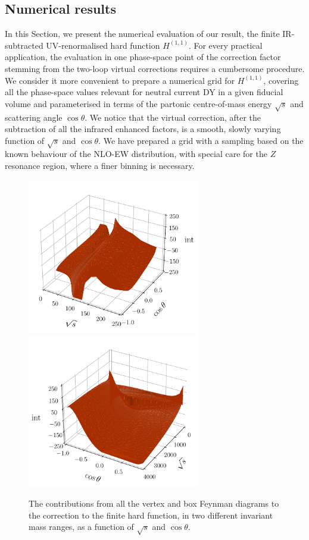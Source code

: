 \documentclass[11pt,a4paper]{article}
\begin{document}
\subsection{Numerical results}
\label{sec:numerics}
%
In this Section, we present the numerical evaluation of our result,
the finite IR-subtracted UV-renormalised hard function ${H}^{(1,1)}$.
For every practical application,
the evaluation in one phase-space point of the correction factor
stemming from the two-loop \oaas virtual corrections
requires a cumbersome procedure.
We consider it more convenient to prepare a numerical grid for
${H}^{(1,1)}$,
covering all the phase-space values relevant for
neutral current DY in a given fiducial volume and parameterised in terms of
the partonic centre-of-mass energy $\sqrt{s}$ and scattering angle $\cos\theta$.
We notice that the virtual correction,
after the subtraction of all the infrared enhanced factors, is a smooth,
slowly varying function of  $\sqrt{s}$ and $\cos\theta$.
We have prepared a grid with a sampling based on the known behaviour
of the NLO-EW distribution,
with special care for the $Z$ resonance region,
where a finer binning is necessary.
\begin{figure}[t]
\begin{center}
\includegraphics[width=7.5cm]{plots/correction-VB-noFSR-250.pdf}
\includegraphics[width=7.5cm]{plots/correction-VB-noFSR-extended.pdf}
\end{center}
\vspace{-2ex}
\caption{\label{fig:correction}
 The contributions from all the vertex and box Feynman diagrams
 to the \oaas correction to the finite hard function,
  in two different invariant mass ranges,
  as a function of $\sqrt{s}$ and $\cos\theta$.
  }
\end{figure}
\end{document}
